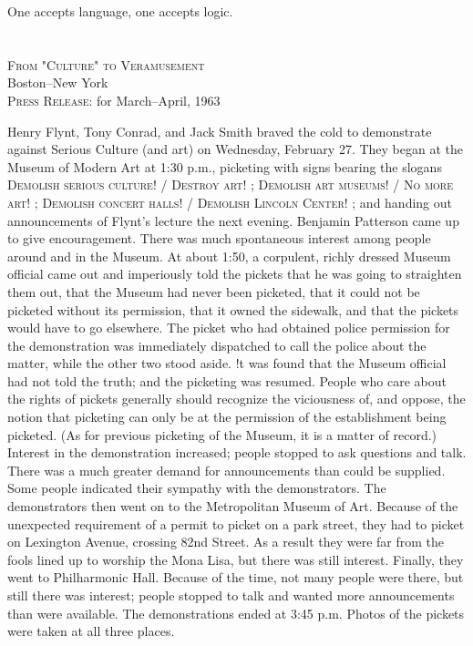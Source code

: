 \documentclass[10pt,twoside,draft]{memoir}
\begin{document}
{One accepts language, one accepts logic. 


\section{}

{ 
\raggedleft
\textsc{From "Culture" to Veramusement} \\
Boston--New York \\
\textsc{Press Release:} for March--April, 1963 \par
}


Henry Flynt, Tony Conrad, and Jack Smith braved the cold to demonstrate 
against Serious Culture (and art) on Wednesday, February 27. They began at 
the Museum of Modern Art at 1:30 p.m., picketing with signs bearing the 
slogans 
\textsc{Demolish serious culture! / Destroy art!} ; 
\textsc{Demolish art museums! / No more art!} ;
\textsc{Demolish concert halls! / Demolish Lincoln Center!} ;
and handing out announcements of 
Flynt's lecture the next evening. Benjamin Patterson came up to give 
encouragement. There was much spontaneous interest among people around 
and in the Museum. At about 1:50, a corpulent, richly dressed Museum 
official came out and imperiously told the pickets that he was going to 
straighten them out, that the Museum had never been picketed, that it could 
not be picketed without its permission, that it owned the sidewalk, and that 
the pickets would have to go elsewhere. The picket who had obtained police 
permission for the demonstration was immediately dispatched to call the 
police about the matter, while the other two stood aside. !t was found that 
the Museum official had not told the truth; and the picketing was resumed. 
People who care about the rights of pickets generally should recognize the 
viciousness of, and oppose, the notion that picketing can only be at the 
permission of the establishment being picketed. (As for previous picketing of 
the Museum, it is a matter of record.) Interest in the demonstration 
increased; people stopped to ask questions and talk. There was a much 
greater demand for announcements than could be supplied. Some people 
indicated their sympathy with the demonstrators. The demonstrators then 
went on to the Metropolitan Museum of Art. Because of the unexpected 
requirement of a permit to picket on a park street, they had to picket on 
Lexington Avenue, crossing 82nd Street. As a result they were far from the 
fools lined up to worship the Mona Lisa, but there was still interest. Finally, 
they went to Philharmonic Hall. Because of the time, not many people were 
there, but still there was interest; people stopped to talk and wanted more 
announcements than were available. The demonstrations ended at 3:45 p.m. 
Photos of the pickets were taken at all three places. 

}
\end{document}

